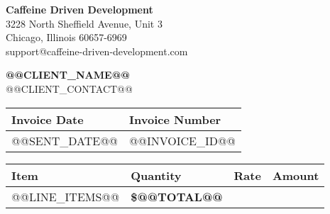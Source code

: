 \documentclass[11pt]{article}
\begin{document}
    \renewcommand{\arraystretch}{1.3}

    \begin{center}
    {\Huge \textbf{Caffeine Driven Development}} \\
    \vspace{0.2cm}
    3228 North Sheffield Avenue, Unit 3\\
    Chicago, Illinois 60657-6969 \\
    support@caffeine-driven-development.com
    \end{center}

    \vspace{1cm}

    \noindent
    \begin{minipage}{0.45\linewidth}
        \textbf{@@CLIENT_NAME@@} \\
        @@CLIENT_CONTACT@@  \\
    \end{minipage}
    \hfill
    \begin{minipage}{0.45\linewidth}
        \raggedleft
        \begin{tabular}{| C{3cm} | C{3cm} |}
            \hline
            \textbf{Invoice Date} & \textbf{Invoice Number} \\
            \hline
            @@SENT_DATE@@ & @@INVOICE_ID@@ \\
            \hline
        \end{tabular}
    \end{minipage}

    \vspace{1cm}

    \noindent
        \begin{tabularx}{\textwidth}{| X | R{1.5cm} | R{1.5cm} | R{2cm} |}
        \hline
            \textbf{Item} & \textbf{Quantity} & \textbf{Rate} & \textbf{Amount} \\
            \hline
            @@LINE_ITEMS@@
             &   \textbf{\$@@TOTAL@@} \\
        \end{tabularx}
\end{document}
